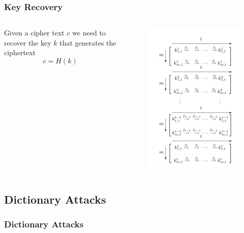 \documentclass{beamer}
\begin{document}
\begin{frame}
\frametitle{Key Recovery}
\begin{columns}[c]
Given a cipher text $c$ we need to recover the key $k$ that generates the ciphertext
\begin{equation*}
c = H(k)
\end{equation*}


\begin{figure}
\includegraphics[width=0.9\linewidth]{figs/classic}
\end{figure}
\end{columns}
\end{frame}


\subsection{Dictionary Attacks}
\begin{frame}
\frametitle{Dictionary Attacks}
\end{frame}
\end{document}
